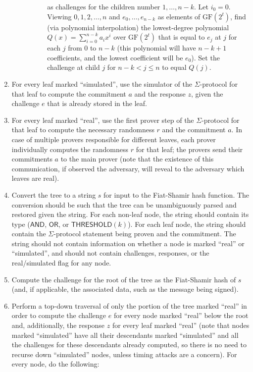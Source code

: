 \documentclass[11pt]{article}
\newcommand{\andnode}{\ensuremath{\mathsf{AND}}}
\newcommand{\ornode}{\ensuremath{\mathsf{OR}}}
\newcommand{\tnode}{\ensuremath{\mathsf{THRESHOLD}}}
\newcommand{\GF}{\ensuremath{\mathrm{GF}}}
\begin{document}
\begin{enumerate}
\begin{itemize}
\begin{itemize}
\begin{enumerate}
	         as challenges for the children number $1, \dots, n-k$.
	         Let $i_0 = 0$. Viewing $0, 1, 2, \dots, n$ and $e_0, \dots, e_{n-k}$ as elements of $\GF(2^t)$, find (via polynomial interpolation) the
	          lowest-degree polynomial $Q(x)=\sum_{i=0}^{n-k} a_i x^i $ over $\GF(2^t)$ that is equal to $e_j$ at $j$ for each $j$ from
	          $0$ to $n-k$ (this polynomial will have $n-k+1$ coefficients, and the lowest coefficient will be $e_0$). Set the challenge at child
	          $j$ for $n-k<j\le n$ to equal $Q(j)$.
 	   \end{enumerate}
        \end{itemize}
    \end{itemize}

    \item For every leaf marked ``simulated'', use the simulator of the $\Sigma$-protocol for that leaf to compute the commitment $a$ and the response $z$, given the challenge $e$ that is already stored in the leaf.

    \item \label{step:realcom} For every leaf marked ``real'', use the first prover step of the $\Sigma$-protocol for that leaf to compute the necessary randomness $r$ and the commitment $a$. In case of multiple provers responsible for different leaves, each prover individually computes the randomness $r$ for that leaf; the provers send their commitments $a$ to the main prover (note that the existence of this communication, if observed the adversary, will reveal to the adversary which leaves are real).

    \item \label{step:fs}  Convert the tree to a string $s$ for input to the Fiat-Shamir hash function. The conversion should be such that the tree can be unambiguously parsed and restored given the string. For each non-leaf node, the string should contain its type ($\andnode$, $\ornode$, or $\tnode(k)$). For each leaf node, the string should contain the $\Sigma$-protocol statement being proven and the commitment. The string should not contain information on whether a node is marked ``real'' or ``simulated'', and should not contain challenges, responses, or the real/simulated flag for any node.

    \item Compute the challenge for the root of the tree as the Fiat-Shamir hash of $s$ (and, if applicable,  the associated data, such as the message being signed).

    \item \label{step:response} Perform a top-down traversal of only the portion of the tree marked ``real'' in order to compute the challenge $e$ for every node marked ``real'' below the root and, additionally, the response $z$ for every leaf marked ``real'' (note that nodes marked ``simulated'' have all their descendants marked ``simulated'' and all the challenges for these descendants already computed, so there is no need to recurse down ``simulated'' nodes, unless timing attacks are a concern). For every node, do the following:


\end{enumerate}
\end{document}
